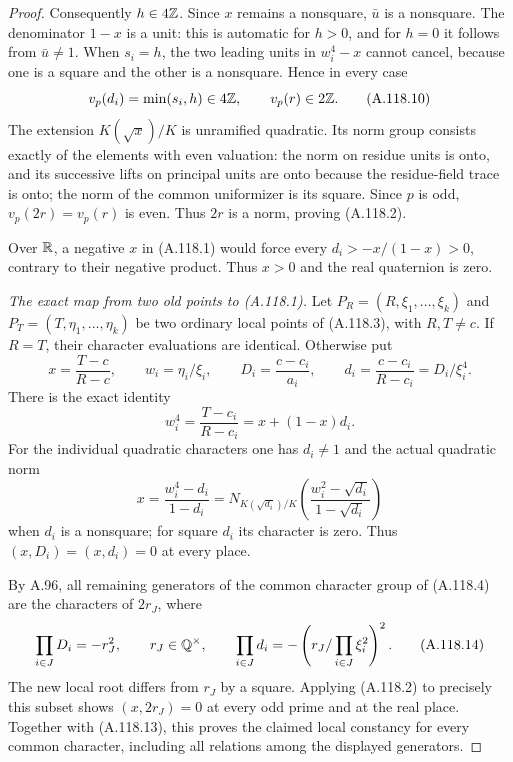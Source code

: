 \begin{proof}
Consequently $h\in4\mathbb Z$.
Since $x$ remains a nonsquare, $\bar u$ is a nonsquare.
The denominator $1-x$ is a unit: this is automatic for
$h>0$, and for $h=0$ it follows from $\bar u\ne1$.
When $s_i=h$, the two leading units in $w_i^4-x$ cannot
cancel, because one is a square and the other is a
nonsquare.  Hence in every case
\[
             v_p(d_i)=\min(s_i,h)\in4\mathbb Z,
                    \qquad v_p(r)\in2\mathbb Z.
\tag{A.118.10}
\]
The extension $K(\sqrt{x})/K$ is unramified quadratic.
Its norm group consists exactly of the elements with even
valuation: the norm on residue units is onto, and its
successive lifts on principal units are onto because the
residue-field trace is onto; the norm of the common
uniformizer is its square.
Since $p$ is odd, $v_p(2r)=v_p(r)$ is even.
Thus $2r$ is a norm, proving (A.118.2).

Over $\mathbb R$, a negative $x$ in (A.118.1) would force every
$d_i>-x/(1-x)>0$, contrary to their negative product.
Thus $x>0$ and the real quaternion is zero.

\emph{The exact map from two old points to (A.118.1).}
Let $P_R=(R,\xi_1,\ldots,\xi_k)$ and
$P_T=(T,\eta_1,\ldots,\eta_k)$ be two ordinary local
points of (A.118.3), with $R,T\ne c$.
If $R=T$, their character evaluations are identical.
Otherwise put
\[
 x=\frac{T-c}{R-c},\qquad
 w_i=\eta_i/\xi_i,\qquad
 D_i=\frac{c-c_i}{a_i},\qquad
 d_i=\frac{c-c_i}{R-c_i}=D_i/\xi_i^4.
\tag{A.118.11}
\]
There is the exact identity
\[
                 w_i^4=\frac{T-c_i}{R-c_i}
                        =x+(1-x)d_i.
\tag{A.118.12}
\]
For the individual quadratic characters one has $d_i\ne1$
and the actual quadratic norm
\[
 x=\frac{w_i^4-d_i}{1-d_i}
    =N_{K(\sqrt{d_i})/K}
          \left(\frac{w_i^2-\sqrt{d_i}}{1-\sqrt{d_i}}\right)
\tag{A.118.13}
\]
when $d_i$ is a nonsquare; for square $d_i$ its character
is zero.  Thus $(x,D_i)=(x,d_i)=0$ at every place.

By A.96, all remaining generators of the common character
group of (A.118.4) are the characters of $2r_J$, where
\[
 \prod_{i\in J}D_i=-r_J^2,\qquad r_J\in\mathbb Q^\times,
 \qquad
 \prod_{i\in J}d_i
      =-\left(r_J/\prod_{i\in J}\xi_i^2\right)^2.
\tag{A.118.14}
\]
The new local root differs from $r_J$ by a square.
Applying (A.118.2) to precisely this subset shows
$(x,2r_J)=0$ at every odd prime and at the real place.
Together with (A.118.13), this proves the claimed local
constancy for every common character, including all
relations among the displayed generators.


\end{proof}
